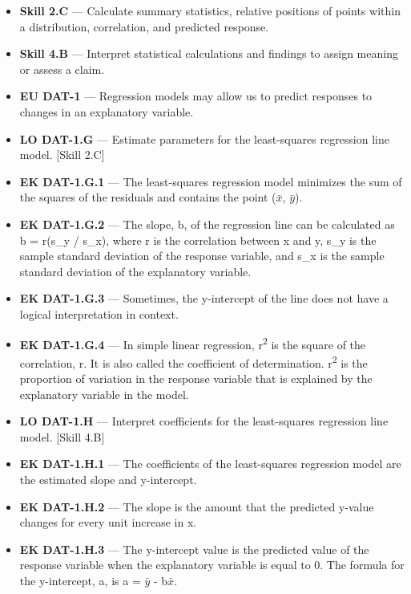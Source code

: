 \documentclass[11pt]{article}
\begin{document}


{\small
\begin{itemize}[leftmargin=1.5em,itemsep=2pt,topsep=2pt]
  \item \textbf{Skill 2.C} --- Calculate summary statistics, relative positions of points within a distribution, correlation, and predicted response.
  \item \textbf{Skill 4.B} --- Interpret statistical calculations and findings to assign meaning or assess a claim.
  \item \textbf{EU DAT-1} --- Regression models may allow us to predict responses to changes in an explanatory variable.
  \item \textbf{LO DAT-1.G} --- Estimate parameters for the least-squares regression line model. [Skill 2.C]
  \item \textbf{EK DAT-1.G.1} --- The least-squares regression model minimizes the sum of the squares of the residuals and contains the point ($\bar{x}$, $\bar{y}$).
  \item \textbf{EK DAT-1.G.2} --- The slope, b, of the regression line can be calculated as b = r(s\_y / s\_x), where r is the correlation between x and y, s\_y is the sample standard deviation of the response variable, and s\_x is the sample standard deviation of the explanatory variable.
  \item \textbf{EK DAT-1.G.3} --- Sometimes, the y-intercept of the line does not have a logical interpretation in context.
  \item \textbf{EK DAT-1.G.4} --- In simple linear regression, r\textsuperscript{2} is the square of the correlation, r. It is also called the coefficient of determination. r\textsuperscript{2} is the proportion of variation in the response variable that is explained by the explanatory variable in the model.
  \item \textbf{LO DAT-1.H} --- Interpret coefficients for the least-squares regression line model. [Skill 4.B]
  \item \textbf{EK DAT-1.H.1} --- The coefficients of the least-squares regression model are the estimated slope and y-intercept.
  \item \textbf{EK DAT-1.H.2} --- The slope is the amount that the predicted y-value changes for every unit increase in x.
  \item \textbf{EK DAT-1.H.3} --- The y-intercept value is the predicted value of the response variable when the explanatory variable is equal to 0. The formula for the y-intercept, a, is a = $\bar{y}$ - b$\bar{x}$.
\end{itemize}
}
\end{document}
